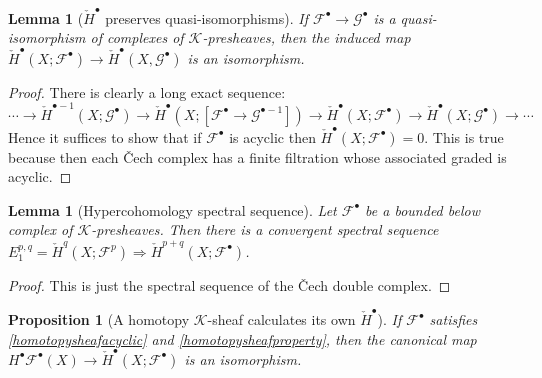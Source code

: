 \documentclass[12pt]{article}
\newtheorem{lemma}[theorem]{Lemma}
\newtheorem{proposition}[theorem]{Proposition}
\theoremstyle{definition}
\theoremstyle{remark}
\numberwithin{equation}{subsection}
\newcommand{\F}{\mathcal F}
\newcommand{\G}{\mathcal G}
\newcommand{\K}{\mathcal K}
\newcommand{\cH}{\check H}
\begin{document}
\begin{lemma}[$\cH^\bullet$ preserves quasi-isomorphisms]\label{qicech}
If $\F^\bullet\to\G^\bullet$ is a quasi-isomorphism of complexes of $\K$-presheaves, then the induced map $\cH^\bullet(X;\F^\bullet)\to\cH^\bullet(X,\G^\bullet)$ is an isomorphism.
\end{lemma}

\begin{proof}
There is clearly a long exact sequence:
\begin{equation}\label{cechmappingconeles}
\cdots\to\cH^{\bullet-1}(X;\G^\bullet)\to\cH^\bullet(X;[\F^\bullet\to\G^{\bullet-1}])\to\cH^\bullet(X;\F^\bullet)\to\cH^\bullet(X;\G^\bullet)\to\cdots
\end{equation}
Hence it suffices to show that if $\F^\bullet$ is acyclic then $\cH^\bullet(X;\F^\bullet)=0$.  This is true because then each \v Cech complex has a finite filtration whose associated graded is acyclic.
\end{proof}

\begin{lemma}[Hypercohomology spectral sequence]\label{hypercohomologyss}
Let $\F^\bullet$ be a bounded below complex of $\K$-presheaves.  Then there is a convergent spectral sequence $E_1^{p,q}=\cH^q(X;\F^p)\Rightarrow\cH^{p+q}(X;\F^\bullet)$.
\end{lemma}

\begin{proof}
This is just the spectral sequence of the \v Cech double complex.
\end{proof}

\begin{proposition}[A homotopy $\K$-sheaf calculates its own $\cH^\bullet$]\label{homotopysheafcechquasiisomorphism}
If $\F^\bullet$ satisfies \eqref{homotopysheafacyclic} and \eqref{homotopysheafproperty}, then the canonical map $H^\bullet\F^\bullet(X)\to\cH^\bullet(X;\F^\bullet)$ is an isomorphism.
\end{proposition}
\end{document}
